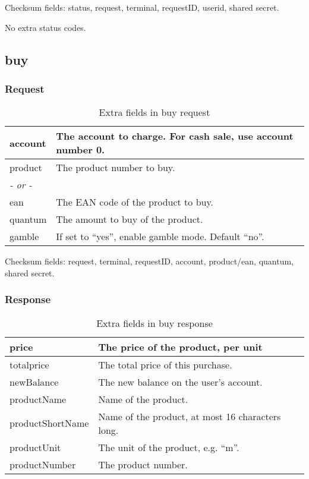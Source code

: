 \documentclass[a4paper,11pt]{article}
\newcommand{\code}[1]
   {\textsf{#1}}
\begin{document}
Checksum fields: status, request, terminal, requestID, userid, shared secret.

No extra status codes.



\subsection{buy}

\subsubsection{Request}
\begin{table}[!h]
  \begin{tabular}{|l|l|}
    \hline
     account & The account to charge. For cash sale, use account
               number 0.\\\hline
     product & The product number to buy.\\
     \multicolumn{2}{l}{\emph{- or -}}\\
     ean     & The EAN code of the product to buy.\\\hline
     quantum & The amount to buy of the product.\\\hline
     gamble  & If set to ``yes'', enable gamble mode. Default ``no''.\\\hline 
  \end{tabular} 
  \caption{Extra fields in \code{buy} request}
\end{table}

Checksum fields: request, terminal, requestID, account, product/ean,
quantum, shared secret.

\subsubsection{Response}
\begin{table}[!h]
  \begin{tabular}{|l|l|}
    \hline
     price         & The price of the product, per unit\\\hline
     totalprice    & The total price of this purchase.\\\hline
     newBalance    & The new balance on the user's account.\\\hline
     productName   & Name of the product. \\\hline
     productShortName & Name of the product, at most 16 characters long.\\\hline
     productUnit   & The unit of the product, e.g. ``m''. \\\hline
     productNumber & The product number. \\\hline
  \end{tabular} 
  \caption{Extra fields in \code{buy} response}
\end{table}
\end{document}
